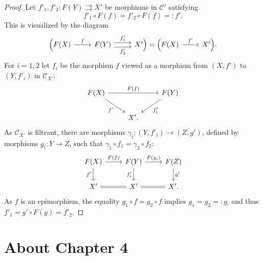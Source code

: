 \documentclass[12pt]{article}
\theoremstyle{remark}
\theoremstyle{definition}
\newcommand{\C}{\mathcal C}
\begin{document}
\begin{proof}
Let $f'_1,f'_2:F(Y)\rightrightarrows X'$ be morphisms in $\C'$ satisfying 
$$
f'_1\circ F(f)=f'_2\circ F(f)=:f'.
$$
This is visualized by the diagram
$$
\begin{tikzcd}
\Big(F(X)\ar{r}{f}&F(Y)\ar[yshift=.7ex]{r}{f'_1}\ar[yshift=-.7ex]{r}[swap]{f'_2}&X'\Big)=\Big(F(X)\ar{r}{f'}&X'\Big).
\end{tikzcd}
$$ 
For $i=1,2$ let $f_i$ be the morphism $f$ viewed as a morphism from $(X,f')$ to $(Y,f'_i)$ in $\C_{X'}$: 
$$
\begin{tikzcd}
F(X)\ar{dr}[swap]{f'}\ar{rr}{F(f)}&&F(Y)\ar{dl}{f'_i}\\ 
{}&X'.
\end{tikzcd}
$$
As $\C_{X'}$ is filtrant, there are morphisms $\gamma_i:(Y,f'_i)\to(Z,g')$, defined by morphisms $g_i:Y\to Z$, such that $\gamma_1\circ f_1=\gamma_2\circ f_2$:
$$
\begin{tikzcd}
F(X)\ar{d}[swap]{f'}\ar{r}{F(f)}&F(Y)\ar{d}[swap]{f'_i}\ar{r}{F(g_i)}&F(Z)\ar{d}{g'}\\ 
X'\ar[equal]{r}&X'\ar[equal]{r}&X'.
\end{tikzcd}
$$
As $f$ is an epimorphism, the equality $g_1\circ f=g_2\circ f$ implies $g_1=g_2=:g$, and thus $f'_1=g'\circ F(g)=f'_2$.
\end{proof}


\section{About Chapter 4}
\end{document}
